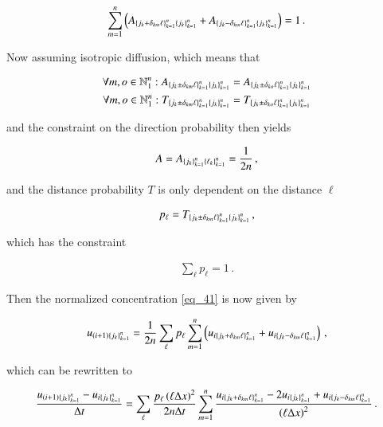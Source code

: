 \documentclass[11pt,english,a4paper]{article}
\begin{document}
\begin{flushleft}
\begin{align}
\sum_{m=1}^n \left({A_{\left\lbrace{j_k+\delta_{km}\ell}\right\rbrace_{k=1}^n\left\lbrace{j_k}\right\rbrace_{k=1}^n}+A_{\left\lbrace{j_k-\delta_{km}\ell}\right\rbrace_{k=1}^n\left\lbrace{j_k}\right\rbrace_{k=1}^n}}\right) = 1 \,.
\label{eq_43}
\end{align}

Now assuming isotropic diffusion, which means that

\begin{align*}
\forall m,o\in \mathbb{N}_1^n : A_{\left\lbrace{j_k\pm\delta_{km} \ell}\right\rbrace_{k=1}^n\left\lbrace{j_k}\right\rbrace_{k=1}^n} &= A_{\left\lbrace{j_k\pm\delta_{ko} \ell}\right\rbrace_{k=1}^n\left\lbrace{j_k}\right\rbrace_{k=1}^n} \\
\forall m,o\in \mathbb{N}_1^n : T_{\left\lbrace{j_k\pm\delta_{km} \ell}\right\rbrace_{k=1}^n\left\lbrace{j_k}\right\rbrace_{k=1}^n} &= T_{\left\lbrace{j_k\pm\delta_{ko} \ell}\right\rbrace_{k=1}^n\left\lbrace{j_k}\right\rbrace_{k=1}^n}
\end{align*}

and the constraint on the direction probability then yields

\begin{align}
A = A_{\left\lbrace{j_k}\right\rbrace_{k=1}^n\left\lbrace{\ell_k}\right\rbrace_{k=1}^n} = \frac{1}{2n}\,,
\label{eq_44}
\end{align}

and the distance probability $T$ is only dependent on the distance $\ell$

\begin{align*}
p_\ell = T_{\left\lbrace{j_k\pm\delta_{km} \ell}\right\rbrace_{k=1}^n\left\lbrace{j_k}\right\rbrace_{k=1}^n}\,,
\end{align*}

which has the constraint

\begin{align*}
\sum_{\ell} p_\ell = 1\,.
\end{align*}

Then the normalized concentration \eqref{eq_41} is now given by

\begin{align*}
u_{(i+1)\left\lbrace{j_k}\right\rbrace_{k=1}^n} = \frac{1}{2n}\sum_\ell p_\ell\sum_{m=1}^n \left({u_{i\left\lbrace{j_k+\delta_{km}\ell}\right\rbrace_{k=1}^n} + u_{i\left\lbrace{j_k-\delta_{km}\ell}\right\rbrace_{k=1}^n}}\right) \,,
\end{align*}

which can be rewritten to

\begin{align}
\frac{u_{(i+1)\left\lbrace{j_k}\right\rbrace_{k=1}^n}-u_{i\left\lbrace{j_k}\right\rbrace_{k=1}^n}}{\Delta t} = \sum_{\ell}\frac{p_\ell \left({\ell \Delta x}\right)^2}{2n\Delta t}\sum_{m=1}^n\frac{u_{i\left\lbrace{j_k+\delta_{km}\ell}\right\rbrace_{k=1}^n} - 2 u_{i\left\lbrace{j_k}\right\rbrace_{k=1}^n} + u_{i\left\lbrace{j_k-\delta_{km}\ell}\right\rbrace_{k=1}^n}}{\left({\ell\Delta x}\right)^2} \,.
\label{eq_45}
\end{align}


\end{flushleft}
\end{document}
